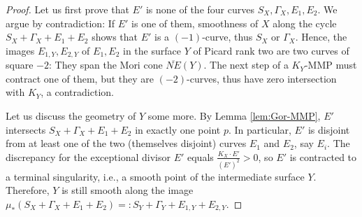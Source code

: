 \documentclass{amsart}
\theoremstyle{definition}
\theoremstyle{remark}
\numberwithin{equation}{section}
\begin{document}
\begin{proof}
Let us first prove that $E'$ is none of the four curves $S_X,\Gamma_X,E_1,E_2$. We argue by contradiction: If $E'$ is one of them, smoothness of $X$ along the cycle $S_X+\Gamma_X+E_1+E_2$ shows that $E'$ is a $(-1)$-curve, thus $S_X$ or $\Gamma_X$. Hence, the images $E_{1,Y},E_{2,Y}$ of $E_1,E_2$ in the surface $Y$ of Picard rank two are two curves of square $-2$: They span the Mori cone $\overline{NE}(Y)$. The next step of a $K_Y$-MMP must contract one of them, but they are $(-2)$-curves, thus have zero intersection with $K_Y$, a contradiction.

Let us discuss the geometry of $Y$ some more. By Lemma \ref{lem:Gor-MMP}, $E'$ intersects $S_X+\Gamma_X+E_{1}+E_{2}$ in exactly one point $p$. In particular, $E'$ is disjoint from at least one of the two (themselves disjoint) curves $E_1$ and $E_2$, say $E_i$. The discrepancy for the exceptional divisor $E'$ equals $\frac{K_X\cdot E'}{(E')^2}>0$, so $E'$ is contracted to a terminal singularity, i.e., a smooth point of the intermediate surface $Y$. Therefore, $Y$ is still smooth along the image $\mu_*(S_X+\Gamma_X+E_{1}+E_{2}) =: S_Y + \Gamma_Y + E_{1,Y}+E_{2,Y}$.


\end{proof}
\end{document}
